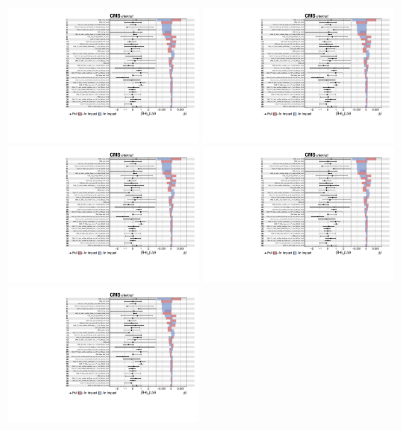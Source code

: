 \begin{figure}[htbp]
  \centering
  \includegraphics[width=0.45\textwidth,page=1]{fig/fitValidation/impacts_VBFRadToWW1000_6p_72.pdf}
  \includegraphics[width=0.45\textwidth,page=2]{fig/fitValidation/impacts_VBFRadToWW1000_6p_72.pdf}\\
  \includegraphics[width=0.45\textwidth,page=3]{fig/fitValidation/impacts_VBFRadToWW1000_6p_72.pdf}
  \includegraphics[width=0.45\textwidth,page=4]{fig/fitValidation/impacts_VBFRadToWW1000_6p_72.pdf}\\
  \includegraphics[width=0.45\textwidth,page=5]{fig/fitValidation/impacts_VBFRadToWW1000_6p_72.pdf}

\end{figure}
